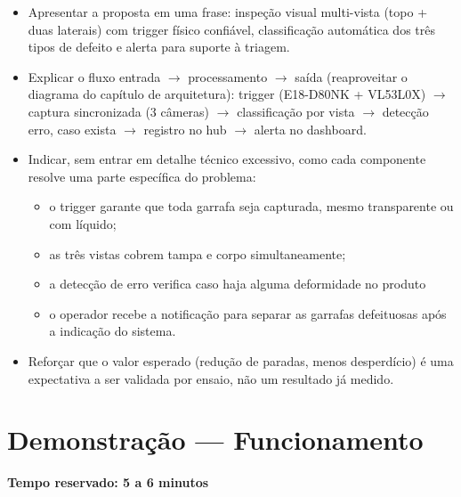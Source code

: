 \documentclass[12pt,a4paper]{report}
\begin{document}
\begin{itemize}
    \item Apresentar a proposta em uma frase: inspeção visual multi-vista (topo + duas laterais) com trigger físico confiável, classificação automática dos três tipos de defeito e alerta para suporte à triagem.
    \item Explicar o fluxo entrada $\rightarrow$ processamento $\rightarrow$ saída (reaproveitar o diagrama do capítulo de arquitetura): trigger (E18-D80NK + VL53L0X) $\rightarrow$ captura sincronizada (3 câmeras) $\rightarrow$ classificação por vista $\rightarrow$ detecção erro, caso exista $\rightarrow$ registro no hub $\rightarrow$ alerta no dashboard.
    \item Indicar, sem entrar em detalhe técnico excessivo, como cada componente resolve uma parte específica do problema:
    \begin{itemize}
        \item o trigger garante que toda garrafa seja capturada, mesmo transparente ou com líquido;
        \item as três vistas cobrem tampa e corpo simultaneamente;
        \item a detecção de erro verifica caso haja alguma deformidade no produto
        \item o operador recebe a notificação para separar as garrafas defeituosas após a indicação do sistema.
    \end{itemize}
    \item Reforçar que o valor esperado (redução de paradas, menos desperdício) é uma expectativa a ser validada por ensaio, não um resultado já medido.
\end{itemize}

\section{Demonstração — Funcionamento}
\textbf{Tempo reservado: 5 a 6 minutos}
\end{document}
